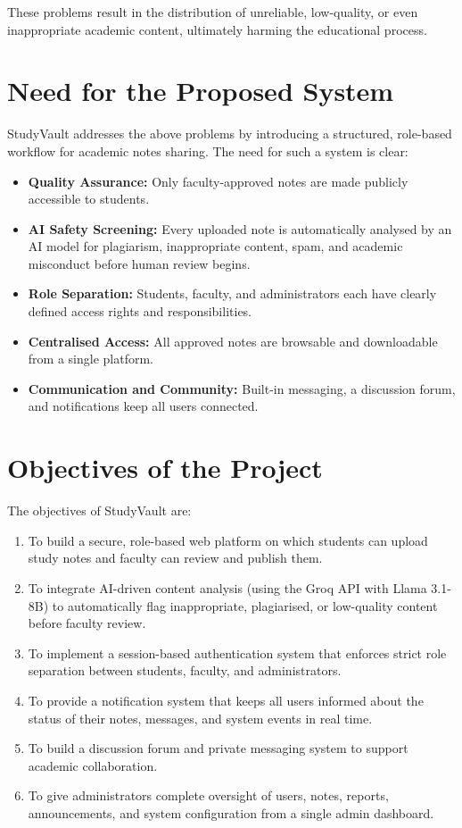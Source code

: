 \documentclass{sgcproject}
\begin{document}
These problems result in the distribution of unreliable, low-quality, or even inappropriate academic content, ultimately harming the educational process.

\section{Need for the Proposed System}

StudyVault addresses the above problems by introducing a structured, role-based workflow for academic notes sharing. The need for such a system is clear:

\begin{itemize}
    \item \textbf{Quality Assurance:} Only faculty-approved notes are made publicly accessible to students.
    \item \textbf{AI Safety Screening:} Every uploaded note is automatically analysed by an AI model for plagiarism, inappropriate content, spam, and academic misconduct before human review begins.
    \item \textbf{Role Separation:} Students, faculty, and administrators each have clearly defined access rights and responsibilities.
    \item \textbf{Centralised Access:} All approved notes are browsable and downloadable from a single platform.
    \item \textbf{Communication and Community:} Built-in messaging, a discussion forum, and notifications keep all users connected.
\end{itemize}

\section{Objectives of the Project}

The objectives of StudyVault are:

\begin{enumerate}
    \item To build a secure, role-based web platform on which students can upload study notes and faculty can review and publish them.
    \item To integrate AI-driven content analysis (using the Groq API with Llama 3.1-8B) to automatically flag inappropriate, plagiarised, or low-quality content before faculty review.
    \item To implement a session-based authentication system that enforces strict role separation between students, faculty, and administrators.
    \item To provide a notification system that keeps all users informed about the status of their notes, messages, and system events in real time.
    \item To build a discussion forum and private messaging system to support academic collaboration.
    \item To give administrators complete oversight of users, notes, reports, announcements, and system configuration from a single admin dashboard.
\end{enumerate}
\end{document}
